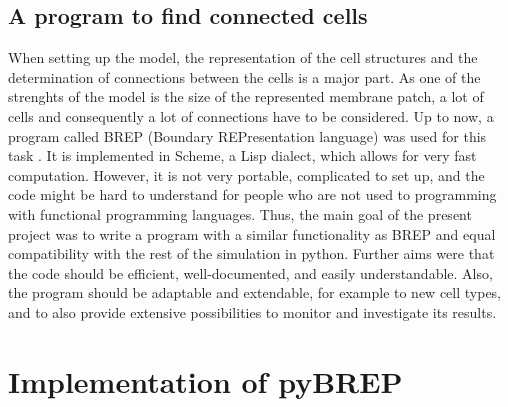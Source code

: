 \documentclass[12pt]{report}
\begin{document}
\subsection{A program to find connected cells}
When setting up the model, the representation of the cell structures and the determination of connections between the cells is a major part. As one of the strenghts of the model is the size of the represented membrane patch, a lot of cells and consequently a lot of connections have to be considered.  Up to now, a program called BREP (Boundary REPresentation language) was used for this task \cite{r:Raikov14}. It is implemented in Scheme, a Lisp dialect, which allows for very fast computation. However, it is not very portable, complicated to set up, and the code might be hard to understand for people who are not used to programming with functional programming languages. Thus, the main goal of the present project was to write a program with a similar functionality as BREP and equal compatibility with the rest of the simulation in python. Further aims were that the code should be efficient, well-documented, and easily understandable. Also, the program should be adaptable and extendable, for example to new cell types, and to also provide extensive possibilities to monitor and investigate its results.








 
\section{Implementation of pyBREP}
\end{document}
